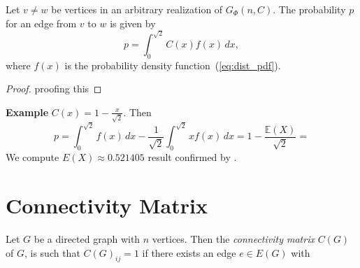 \begin{proposition} Let $v \neq w$ be vertices in an arbitrary
  realization of $G_{\Phi}(n,C)$. The probability $p$ for an edge
  from $v$ to $w$ is given by 
  \[
    p = \int_0^{\sqrt{2}} C(x) f(x) \, dx,
  \]
  where $f(x)$ is the probability density function~(\ref{eq:dist_pdf}).
\end{proposition}
%
\begin{proof}
  proofing this
\end{proof}

\textbf{Example} $C(x) = 1 - \frac{x}{\sqrt{2}}$. Then 
\[
  p = \int_{0}^{\sqrt{2}} f(x) \, dx - \frac{1}{\sqrt{2}}
  \int_0^{\sqrt{2}} x f(x) \, dx = 1 - \frac{\mathbb{E}(X)}{\sqrt{2}}
  =
\]
We compute $E(X) \approx 0.521405$ result confirmed by \textcite{Philip2007}.



\section{Connectivity Matrix}

\begin{definition}
Let $G$ be a directed graph with $n$ vertices. Then the
\textit{connectivity matrix} $C(G)$ of $G$, is such that $C(G)_{ij} =
1$ if there exists an edge $e \in E(G)$ with 
\end{definition}



% 





